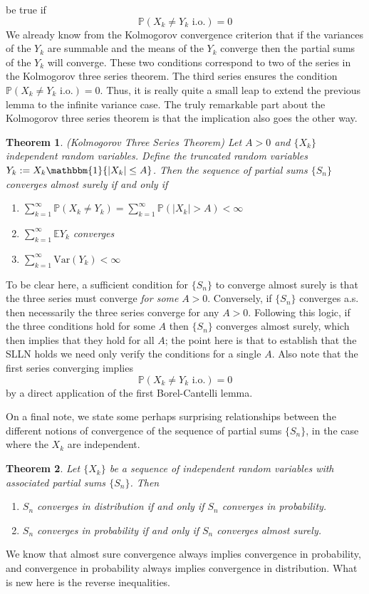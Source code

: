 \documentclass[12pt]{article}
\newcommand*{\abs}[1]{\left\lvert#1\right\rvert}
\newcommand{\E}{\mathbb{E}}
\newcommand{\Var}{\mathrm{Var}}
\newcommand{\Prob}{\mathbb{P}}
\newtheorem{thm}{Theorem}
\begin{document}
be true if 
\[\Prob(X_k \neq Y_k \text{ i.o.}) = 0\]
We already know from the Kolmogorov convergence criterion that if the variances of the $Y_k$ are summable and the means of the $Y_k$ converge then the partial sums of the $Y_k$ will converge. These two conditions
correspond to two of the series in the Kolmogorov three series theorem. The third series ensures the condition $\Prob(X_k \neq Y_k \text{ i.o.}) = 0$. Thus, it is really quite a small leap to extend the previous lemma to 
the infinite variance case. The truly remarkable part about the Kolmogorov three series theorem is that the implication also goes the other way. 
\begin{thm}
(Kolmogorov Three Series Theorem) Let $A > 0$ and $\{X_k\}$ independent random variables. Define the truncated random variables $Y_k := X_k \mathbbm{1}\{\abs{X_k} \leq A\}$. Then the sequence of partial sums 
$\{S_n\}$ converges almost surely if and only if
\begin{enumerate}
\item $\sum_{k = 1}^{\infty} \Prob(X_k \neq Y_k) = \sum_{k = 1}^{\infty} \Prob(\abs{X_k} > A) < \infty$ 
\item $\sum_{k = 1}^{\infty} \E Y_k$ converges 
\item $\sum_{k = 1}^{\infty} \Var(Y_k) < \infty$ 
\end{enumerate}
\end{thm}
To be clear here, a sufficient condition for $\{S_n\}$ to converge almost surely is that the three series must converge \textit{for some } $A > 0$. Conversely, if $\{S_n\}$ converges a.s. then 
necessarily the three series converge for any $A > 0$. Following this logic, if the three conditions hold for some $A$ then $\{S_n\}$ converges almost surely, which then implies that they hold 
for all $A$; the point here is that to establish that the SLLN holds we need only verify the conditions for a single $A$. Also note that the first series converging implies 
\[\Prob(X_k \neq Y_k \text{ i.o.}) = 0\]
by a direct application of the first Borel-Cantelli lemma. 

On a final note, we state some perhaps surprising relationships between the different notions of convergence of the sequence of partial sums $\{S_n\}$, in the case where the $X_k$ are 
independent. 
\begin{thm}
Let $\{X_k\}$ be a sequence of independent random variables with associated partial sums $\{S_n\}$. Then 
\begin{enumerate}
\item $S_n$ converges in distribution if and only if $S_n$ converges in probability. 
\item $S_n$ converges in probability if and only if $S_n$ converges almost surely. 
\end{enumerate}
\end{thm}
We know that almost sure convergence always implies convergence in probability, and convergence in probability always implies convergence in distribution. What is new here is the reverse inequalities. 
\end{document}
